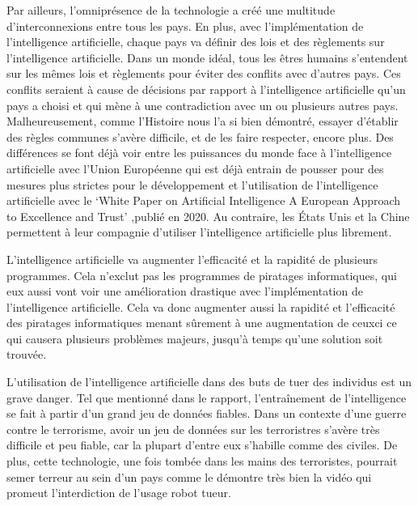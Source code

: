 \documentclass[letterpaper,10pt,french]{sphinxmanual}
\begin{document}
Par ailleurs, l’omniprésence de la technologie a créé une multitude d’interconnexions entre
tous les pays. En plus, avec l’implémentation de l’intelligence artificielle, chaque pays va
définir des lois et des règlements sur l’intelligence artificielle.
Dans un monde idéal, tous les êtres humains s’entendent sur les mêmes lois et règlements pour
éviter des conflits avec d’autres pays. Ces conflits seraient à cause de décisions par rapport
à l’intelligence artificielle qu’un pays a choisi et qui mène à une contradiction avec un ou
plusieurs autres pays. Malheureusement, comme l’Histoire nous l’a si bien démontré, essayer
d’établir des règles communes s’avère difficile, et de les faire respecter, encore plus. Des différences
se font déjà voir entre les puissances du monde face à l’intelligence artificielle avec l’Union
Européenne qui est déjà entrain de pousser pour des mesures plus strictes pour le développement et
l’utilisation de l’intelligence artificielle avec le ‘White Paper on Artificial Intelligence \textendash{}
A European Approach to Excellence and Trust’ ,publié en 2020. Au contraire, les États \sphinxhyphen{} Unis
et la Chine permettent à leur compagnie d’utiliser l’intelligence artificielle plus librement.

L’intelligence artificielle va augmenter l’efficacité et la rapidité de plusieurs programmes.
Cela n’exclut pas les programmes de piratages informatiques, qui eux aussi vont voir une
amélioration drastique avec l’implémentation de l’intelligence artificielle. Cela va donc
augmenter aussi la rapidité et l’efficacité des piratages informatiques menant sûrement à
une augmentation de ceux\sphinxhyphen{}ci ce qui causera plusieurs problèmes majeurs, jusqu’à temps
qu’une solution soit trouvée.

L’utilisation de l’intelligence artificielle dans des buts de tuer des individus est un grave
danger. Tel que mentionné dans le rapport, l’entraînement de l’intelligence se fait à partir
d’un grand jeu de données fiables. Dans un contexte d’une guerre contre le terrorisme, avoir
un jeu de données sur les terroristres s’avère très difficile et peu fiable, car la plupart
d’entre eux s’habille comme des civiles. De plus, cette technologie, une fois tombée dans les mains
des terroristes, pourrait semer terreur au sein d’un pays comme le démontre très bien la vidéo
qui promeut l’interdiction de l’usage robot tueur.
\end{document}
